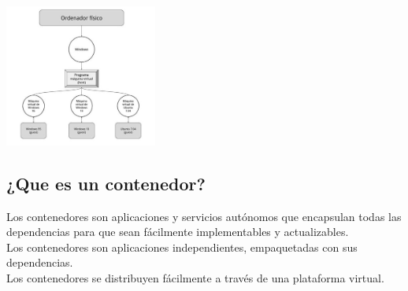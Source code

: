 \documentclass[twoside,twocolumn]{article}
\begin{document}
\begin{center}
	\includegraphics[width=5cm]{./Imagenes/virtualizacion} 
	\end{center}




\subsection{¿Que es un contenedor?}

Los contenedores son aplicaciones y servicios autónomos que encapsulan todas las dependencias para que sean fácilmente implementables y actualizables.\\
Los contenedores son aplicaciones independientes, empaquetadas con sus dependencias.\\
Los contenedores se distribuyen fácilmente a través de una plataforma virtual.
\end{document}
